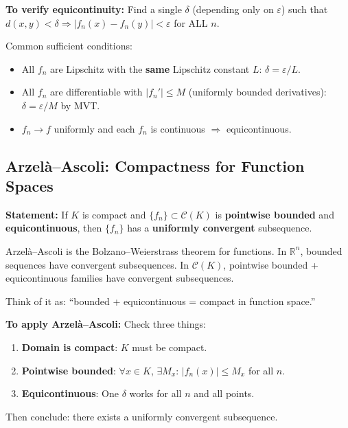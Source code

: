 \documentclass[11pt]{article}
\newcommand{\R}{\mathbb{R}}
\newcommand{\eps}{\varepsilon}
\theoremstyle{definition}
\begin{document}
\begin{application}
\textbf{To verify equicontinuity:} Find a single $\delta$ (depending only on $\eps$) such that $d(x,y) < \delta \Rightarrow |f_n(x) - f_n(y)| < \eps$ for ALL $n$.

Common sufficient conditions:
\begin{itemize}
\item All $f_n$ are Lipschitz with the \textbf{same} Lipschitz constant $L$: $\delta = \eps/L$.
\item All $f_n$ are differentiable with $|f_n'| \leq M$ (uniformly bounded derivatives): $\delta = \eps/M$ by MVT.
\item $f_n \to f$ uniformly and each $f_n$ is continuous $\Rightarrow$ equicontinuous.
\end{itemize}
\end{application}

\subsection{Arzel\`a--Ascoli: Compactness for Function Spaces}

\textbf{Statement:} If $K$ is compact and $\{f_n\} \subset \mathscr{C}(K)$ is \textbf{pointwise bounded} and \textbf{equicontinuous}, then $\{f_n\}$ has a \textbf{uniformly convergent} subsequence.

\begin{intuition}
Arzel\`a--Ascoli is the Bolzano--Weierstrass theorem for functions. In $\R^n$, bounded sequences have convergent subsequences. In $\mathscr{C}(K)$, pointwise bounded + equicontinuous families have convergent subsequences.

Think of it as: ``bounded + equicontinuous = compact in function space.''
\end{intuition}

\begin{application}
\textbf{To apply Arzel\`a--Ascoli:} Check three things:
\begin{enumerate}
\item \textbf{Domain is compact}: $K$ must be compact.
\item \textbf{Pointwise bounded}: $\forall x \in K$, $\exists M_x$: $|f_n(x)| \leq M_x$ for all $n$.
\item \textbf{Equicontinuous}: One $\delta$ works for all $n$ and all points.
\end{enumerate}
Then conclude: there exists a uniformly convergent subsequence.
\end{application}
\end{document}
